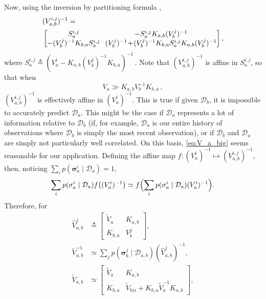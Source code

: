 \documentclass{article}
\newcommand{\given}{\ensuremath{\mid}}
\newcommand{\cm}[1]{\ensuremath{\mathcal{#1}}}
\newcommand{\bm}[1]{\ensuremath{\mathbf{#1}}}
\newcommand{\data}{\ensuremath{\cm{D}}}
\newcommand{\vect}[1]{\bm{#1}}
\newcommand{\vs}{\vect{\sigma}}
\newcommand{\fPr}{p}
\newcommand{\Prob}[2]{\fPr(#1 \given #2 )}
\newcommand{\defequal}{\triangleq}
\begin{document}
Now, using the inversion by partitioning formula \citep[Section 2.7]
{NumericalRecipes},
\begin{align*}
\hspace{-0.2cm}&({V}^{i,j}_{a,b})^{-1} = \\
&\begin{bmatrix}
 S^{i,j}_a &\hspace{-0.1cm} -S^{i,j}_a K_{a,b} (V^j_b)^{-1} \\
 - (V^j_b)^{-1} K_{b,a} S^{i,j}_a &\hspace{-0.1cm} (V^j_b)^{-1}\!+\!(V^j_b)^{-1} K_{b,a} S^{i,j}_a K_{a,b} (V^j_b)^{-1} 
\end{bmatrix},
\end{align*}
where
$
S^{i,j}_a \defequal (V^i_a -K_{a,b} (V^j_b)^{-1}K_{b,a})^{-1}\,.
$ Note that $({V}^{i,j}_{a,b})^{-1}$ is affine in $S^{i,j}_a$, so that when
\begin{equation}\label{eq:V_a_big}
 V_a \gg K_{a,b} V_b^{-1} K_{b,a}\,,
\end{equation}
$({V}^{i,j}_{a,b})^{-1}$ is effectively affine in $(V^i_a)^{-1}$. This
is true if given $\data_b$, it is impossible to accurately predict
$\data_a$. This might be the case if $\data_a$ represents a lot of
information relative to $\data_b$ (if, for example, $\data_a$ is our
entire history of observations where $\data_b$ is simply the most
recent observation), or if $\data_b$ and $\data_a$ are simply not
particularly well correlated. On this basis, \eqref{eq:V_a_big} seems
reasonable for our application. Defining the affine map $f\colon (V^i_a)^{-1}
\mapsto ({V}^{i,j}_{a,b})^{-1}$, then, noticing $\sum_i \Prob{\vs^i_{a}}{\data_{a}} = 1$,
$$
\sum_i \Prob{\vs^i_{a}}{\data_{a}} f\bigl((V^i_a)^{-1} \bigr) \simeq f\Bigl(\sum_i \Prob{\vs^i_{a}}{\data_{a}}(V^i_a)^{-1} \Bigr).
$$
Therefore, for
\begin{align*}
\hat{V}^{j}_{a,b} & \defequal
\begin{bmatrix}
 \tilde{V}_a & K_{a,b}
\\
 K_{b,a} & V^j_b
\end{bmatrix},
\\
\tilde{V}^{-1}_{a,b} &\simeq \sum_j \Prob{\vs^j_{b}}{\data_{a,b}} (\hat{V}^{j}_{a,b})^{-1},
\nonumber\\
\tilde{V}_{a,b} & \simeq
\begin{bmatrix}
 \tilde{V}_a & K_{a,b}\\
 K_{b,a} & \tilde{V}_{b|a} + K_{b,a} \tilde{V}_a^{-1} K_{a,b}
\end{bmatrix},
\end{align*}
\end{document}
